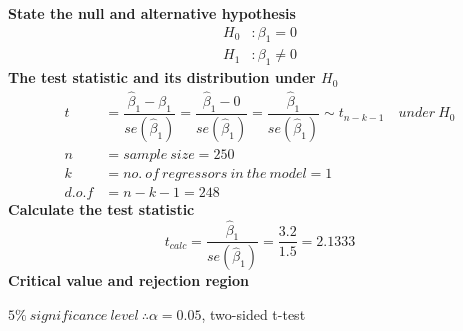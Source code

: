 \documentclass[12pt]{report}
\begin{document}
\noindent \textbf{State the null and alternative hypothesis}
\begin{align*}
H_0&: \beta_1 = 0 \\
H_1&: \beta_1 \neq 0
\end{align*}
\noindent \textbf{The test statistic and its distribution under $H_0$}
\begin{align*}
t &= \dfrac{\hat{\beta}_1 - \beta_1}{se(\hat{\beta}_1)} = \dfrac{\hat{\beta}_1 - 0}{se(\hat{\beta}_1)} = \dfrac{\hat{\beta}_1}{se(\hat{\beta}_1)} \sim t_{n-k-1} \quad under\ H_0 \\
n &= sample\ size = 250 \\
k &= no.\ of\ regressors\ in\ the\ model = 1 \\
d.o.f &= n-k-1=248
\end{align*}
\noindent \textbf{Calculate the test statistic}
$$t_{calc} = \dfrac{\hat{\beta}_1}{se(\hat{\beta}_1)} = \dfrac{3.2}{1.5} = 2.1333$$
\noindent \textbf{Critical value and rejection region}

\noindent $5\%\ significance\ level\ \therefore \alpha = 0.05$, two-sided t-test
\end{document}
